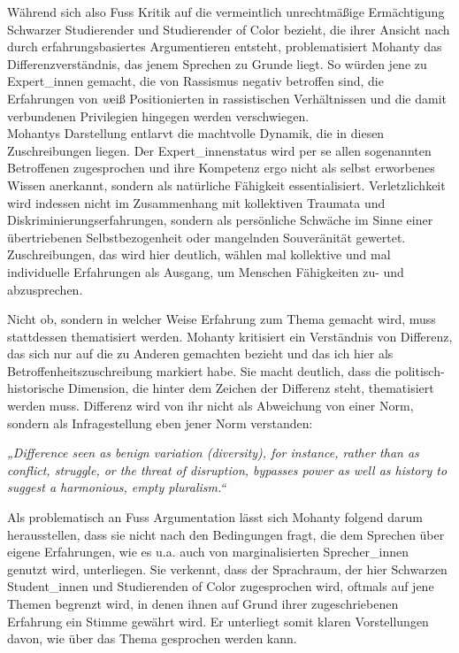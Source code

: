 Während sich also Fuss Kritik auf die vermeintlich unrechtmäßige Ermächtigung
Schwarzer Studierender und Studierender of Color bezieht, die ihrer Ansicht
nach durch erfahrungsbasiertes Argumentieren entsteht, problematisiert Mohanty
das Differenzverständnis, das jenem Sprechen zu Grunde liegt. So würden jene zu
Expert\_innen gemacht, die von Rassismus negativ betroffen sind, die Erfahrungen
von \textit{w}eiß Positionierten in rassistischen Verhältnissen und die damit
verbundenen Privilegien hingegen werden verschwiegen.\\
Mohantys Darstellung
entlarvt die machtvolle Dynamik, die in diesen Zuschreibungen liegen. Der
Expert\_innenstatus wird per se allen sogenannten Betroffenen zugesprochen und
ihre Kompetenz ergo nicht als selbst erworbenes Wissen anerkannt, sondern als
natürliche Fähigkeit essentialisiert. Verletzlichkeit wird indessen nicht im
Zusammenhang mit kollektiven Traumata und Diskriminierungserfahrungen, sondern
als persönliche Schwäche im Sinne einer übertriebenen Selbstbezogenheit oder
mangelnden Souveränität gewertet. Zuschreibungen, das wird hier deutlich,
wählen mal kollektive und mal individuelle Erfahrungen als Ausgang, um Menschen
Fähigkeiten zu- und abzusprechen. 

Nicht ob, sondern in welcher Weise Erfahrung zum Thema gemacht wird, muss
stattdessen thematisiert werden. Mohanty kritisiert ein Verständnis von
Differenz, das sich nur auf die zu Anderen gemachten bezieht und das ich hier
als Betroffenheitszuschreibung markiert habe. Sie macht deutlich, dass die
politisch-historische Dimension, die hinter dem Zeichen der Differenz steht,
thematisiert werden muss.  Differenz wird von ihr nicht als Abweichung von
einer Norm, sondern als Infragestellung eben jener Norm verstanden:

\begin{myenv}
  \textit{„Difference seen as benign variation (diversity), for instance,
  rather than as conflict, struggle, or the threat of disruption, bypasses
power as well as history to suggest a harmonious, empty
pluralism.“\footnotemark{}}
\end{myenv}

Als problematisch an Fuss Argumentation lässt sich Mohanty folgend darum
herausstellen, dass sie nicht nach den Bedingungen fragt, die dem Sprechen über
eigene Erfahrungen, wie es u.a. auch von marginalisierten Sprecher\_innen
genutzt wird, unterliegen. Sie verkennt, dass der Sprachraum, der hier
Schwarzen Student\_innen und Studierenden of Color zugesprochen wird, oftmals
auf jene Themen begrenzt wird, in denen ihnen auf Grund ihrer zugeschriebenen
Erfahrung ein Stimme gewährt wird. Er unterliegt somit klaren Vorstellungen
davon, wie über das Thema gesprochen werden kann. 

